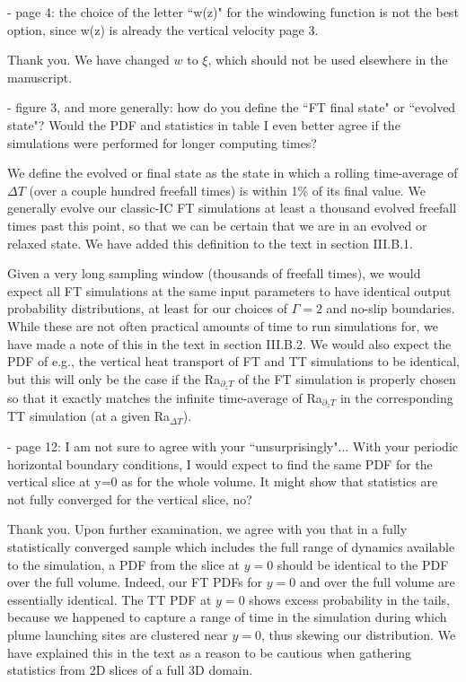 \documentclass[aps, 11pt, singlecolumn]{revtex4-1} %
\begin{document}
\begin{singlespace}
\begin{myquotation}
- page 4: the choice of the letter ``w(z)" for the windowing function is not the best option, since w(z) is already the vertical velocity page 3.
\end{myquotation}
Thank you.
We have changed $w$ to $\xi$, which should not be used elsewhere in the manuscript.

\begin{myquotation}
- figure 3, and more generally: how do you define the ``FT final state" or ``evolved state"? 
Would the PDF and statistics in table I even better agree if the simulations were performed for longer computing times?
\end{myquotation}
We define the evolved or final state as the state in which a rolling time-average of $\Delta T$ (over a couple hundred freefall times) is within 1\% of its final value.
We generally evolve our classic-IC FT simulations at least a thousand evolved freefall times past this point, so that we can be certain that we are in an evolved or relaxed state.
We have added this definition to the text in section III.B.1.

Given a very long sampling window (thousands of freefall times), we would expect all FT simulations at the same input parameters to have identical output probability distributions, at least for our choices of $\Gamma = 2$ and no-slip boundaries.
While these are not often practical amounts of time to run simulations for, we have made a note of this in the text in section III.B.2.
We would also expect the PDF of e.g., the vertical heat transport of FT and TT simulations to be identical, but this will only be the case if the Ra$_{\partial_z T}$ of the FT simulation is properly chosen so that it exactly matches the infinite time-average of Ra$_{\partial_z T}$ in the corresponding TT simulation (at a given Ra$_{\Delta T}$).

\begin{myquotation}
- page 12: I am not sure to agree with your ``unsurprisingly"... With your periodic horizontal boundary conditions, I would expect to find the same PDF for the vertical slice at y=0 as for the whole volume. 
It might show that statistics are not fully converged for the vertical slice, no?
\end{myquotation}
Thank you.
Upon further examination, we agree with you that in a fully statistically converged sample which includes the full range of dynamics available to the simulation, a PDF from the slice at $y = 0$ should be identical to the PDF over the full volume.
Indeed, our FT PDFs for $y = 0$ and over the full volume are essentially identical.
The TT PDF at $y = 0$ shows excess probability in the tails, because we happened to capture a range of time in the simulation during which plume launching sites are clustered near $y = 0$, thus skewing our distribution.
We have explained this in the text as a reason to be cautious when gathering statistics from 2D slices of a full 3D domain.


\end{singlespace}
\end{document}
